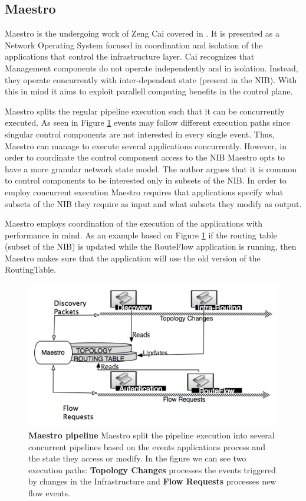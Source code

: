 \begin{itemize}
\subsection{Maestro}

Maestro is the undergoing work of Zeng Cai covered in
\cite{maestro}. It is presented as a Network Operating System focused
in coordination and isolation of the applications  that control the
infrastructure layer. Cai recognizes that Management components do not
operate independently and in isolation. Instead, they operate
concurrently with inter-dependent state (present in the NIB). With this in mind
it aims to exploit parallell computing benefits in the control plane. 

Maestro splits the regular pipeline execution such that it can
be concurrently executed. As seen in Figure \ref{fig:maestro-pipeline} events may
follow different execution paths since singular control components are
not interested in every single event. Thus, Maestro can manage to
execute several applications concurrently. However, in order to
coordinate the control component access to the NIB Maestro opts to
have a more granular network state model. The author argues that it is
common to control components to be  interested only in  subsets of the
NIB. In order to employ concurrent execution Maestro requires that
applications specify  what subsets of the NIB they require as input
and what subsets they modify as output. 

Maestro employs
coordination of the  execution of the applications with performance in
mind. As an example based on Figure \ref{fig:maestro-pipeline} if the routing table
(subset of the NIB) is updated while the RouteFlow application is running, then
Maestro makes sure that the application will use the old version of
the RoutingTable.

\begin{figure}
  \centering 
  \footnotesize
  \includegraphics[scale=0.5]{pic/maestro-pipeline.png}
  \caption[Maestro pipeline]{\textbf{Maestro pipeline} Maestro split the pipeline execution
  into several concurrent pipelines based on the events applications
  process and the state they access or modify. In the figure we can
  see two execution paths: \textbf{Topology Changes} processes the
  events triggered by changes in the Infrastructure and \textbf{Flow
    Requests} processes new flow events.}
  \label{fig:maestro-pipeline}
\end{figure}



\end{itemize}
